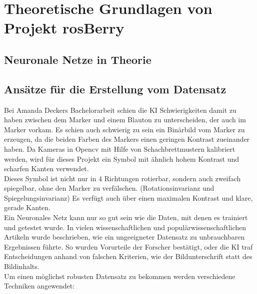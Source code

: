\documentclass[conference]{IEEEtran}
\begin{document}
\section{Theoretische Grundlagen von Projekt rosBerry}

\subsection{Neuronale Netze in Theorie}	%

\subsection{Ansätze für die Erstellung vom Datensatz}	%

Bei Amanda Deckers Bachelorarbeit schien die KI Schwierigkeiten damit zu haben zwischen dem Marker und einem Blauton zu unterscheiden, der auch im Marker vorkam.
Es schien auch schwierig zu sein ein Binärbild vom Marker zu erzeugen, da die beiden Farben des Markers einen geringen Kontrast zueinander haben.
Da Kameras in Opencv mit Hilfe von Schachbrettmustern kalibriert werden, wird für dieses Projekt ein Symbol mit ähnlich hohem Kontrast und scharfen Kanten verwendet.
\\
Dieses Symbol ist nicht nur in 4 Richtungen rotierbar, sondern auch zweifach spiegelbar, ohne den Marker zu verfälschen. (Rotationsinvarianz und Spiegelungsinvarianz)
Es verfügt auch über einen maximalen Kontrast und klare, gerade Kanten.
\\
\noindent
Ein Neuronales Netz kann nur so gut sein wie die Daten, mit denen es trainiert und getestet wurde.
In vielen wissenschaftlichen und populärwissenschaftlichen Artikeln wurde beschrieben, wie ein ungeeigneter Datensatz zu unbrauchbaren Ergebnissen führte.
So wurden Vorurteile der Forscher bestätigt, oder die KI traf Entscheidungen anhand von falschen Kriterien, wie der Bildunterschrift statt des Bildinhalts.
\\
Um einen möglichst robusten Datensatz zu bekommen werden verschiedene Techniken angewendet:
\end{document}
